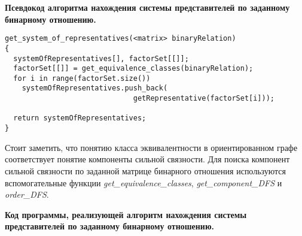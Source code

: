 \documentclass[spec, och, otchet, hidelinks]{SCWorks}
\begin{document}
\par \textbf{Псевдокод алгоритма нахождения системы представителей по заданному
  бинарному отношению.}

\begin{lstlisting}[caption=Псевдокод алгоритма., mathescape]
get_system_of_representatives(<matrix> binaryRelation)
{
  systemOfRepresentatives[], factorSet[[]];
  factorSet[[]] = get_equivalence_classes(binaryRelation);
  for i in range(factorSet.size())
    systemOfRepresentatives.push_back(
                              getRepresentative(factorSet[i]));

  return systemOfRepresentatives;
}
\end{lstlisting}

\par Стоит заметить, что понятию класса эквивалентности в ориентированном графе
соответствует понятие компоненты сильной связности. Для поиска компонент сильной
связности по заданной матрице бинарного отношения используются вспомогательные функции
\textit{get\_equivalence\_classes}, \textit{get\_component\_DFS} и
\textit{order\_DFS}.

\par \textbf{Код программы, реализующей алгоритм нахождения системы
  представителей по заданному бинарному отношению.}
\end{document}
